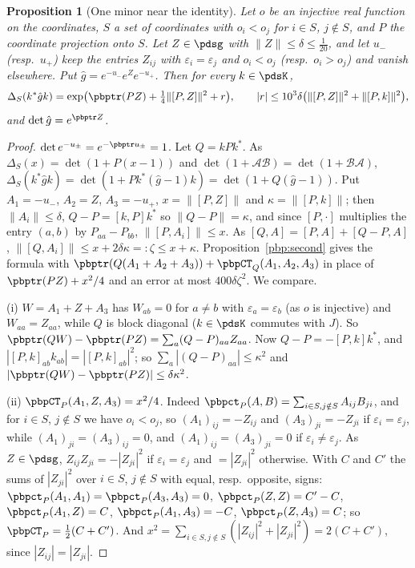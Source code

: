 \documentclass[10pt]{amsart}
\newtheorem{proposition}[theorem]{Proposition}
\theoremstyle{definition}
\theoremstyle{remark}
\begin{document}
\begin{proposition}[One minor near the identity]\label{pbp:minorconj}
Let $o$ be an injective real function on the coordinates, $S$ a set of coordinates with $o_i<o_j$
for $i\in S$, $j\notin S$, and $P$ the coordinate projection onto $S$. Let $Z\in\pdsg$ with
$\|Z\|\le\delta\le\frac1{20}$, and let $u_-$ \textup(resp.\ $u_+$\textup) keep the entries $Z_{ij}$ with
$\varepsilon_i=\varepsilon_j$ and $o_i<o_j$ \textup(resp.\ $o_i>o_j$\textup) and vanish elsewhere. Put
$\hat g=e^{-u_-}e^Ze^{-u_+}$. Then for every $k\in\pdsK$,
\[
\Delta_S(k^*\hat gk)=\exp\bigl(\pbptr(PZ)+\tfrac14\|[P,Z]\|^2+r\bigr),\qquad|r|\le10^3\delta\bigl(
\|[P,Z]\|^2+\|[P,k]\|^2\bigr),
\]
and $\det\hat g=e^{\pbptr Z}$.
\end{proposition}
\begin{proof}
$\det e^{-u_\pm}=e^{-\pbptr u_\pm}=1$. Let $Q=kPk^*$. As $\Delta_S(x)=\det(1+P(x-1))$ and $\det(1+
\mathcal A\mathcal B)=\det(1+\mathcal B\mathcal A)$, $\Delta_S(k^*\hat gk)=\det(1+Pk^*(\hat g-1)k)=\det(1+
Q(\hat g-1))$. Put $A_1=-u_-$, $A_2=Z$, $A_3=-u_+$, $x=\|[P,Z]\|$ and $\kappa=\|[P,k]\|$; then
$\|A_i\|\le\delta$, $Q-P=[k,P]k^*$ so $\|Q-P\|=\kappa$, and since $[P,\cdot]$ multiplies the entry
$(a,b)$ by $P_{aa}-P_{bb}$, $\|[P,A_i]\|\le x$. As $[Q,A]=[P,A]+[Q-P,A]$, $\|[Q,A_i]\|\le x+2\delta\kappa
=:\zeta\le x+\kappa$. Proposition~\ref{pbp:second} gives the formula with $\pbptr(Q(A_1+A_2+A_3))+
\pbpCT_Q(A_1,A_2,A_3)$ in place of $\pbptr(PZ)+x^2/4$ and an error at most $400\delta\zeta^2$. We compare.

(i) $W=A_1+Z+A_3$ has $W_{ab}=0$ for $a\ne b$ with $\varepsilon_a=\varepsilon_b$ (as $o$ is injective) and
$W_{aa}=Z_{aa}$, while $Q$ is block diagonal ($k\in\pdsK$ commutes with $J$). So $\pbptr(QW)-
\pbptr(PZ)=\sum_a(Q-P)_{aa}Z_{aa}$. Now $Q-P=-[P,k]k^*$, and $|[P,k]_{ab}k_{ab}|=|[P,k]_{ab}|^2$; so
$\sum_a|(Q-P)_{aa}|\le\kappa^2$ and $|\pbptr(QW)-\pbptr(PZ)|\le\delta\kappa^2$.

(ii) $\pbpCT_P(A_1,Z,A_3)=x^2/4$. Indeed $\pbpct_P(A,B)=\sum_{i\in S,j\notin S}A_{ij}B_{ji}$, and for
$i\in S$, $j\notin S$ we have $o_i<o_j$, so $(A_1)_{ij}=-Z_{ij}$ and $(A_3)_{ji}=-Z_{ji}$ if
$\varepsilon_i=\varepsilon_j$, while $(A_1)_{ji}=(A_3)_{ij}=0$, and $(A_1)_{ij}=(A_3)_{ji}=0$ if
$\varepsilon_i\ne\varepsilon_j$. As $Z\in\pdsg$, $Z_{ij}Z_{ji}=-|Z_{ji}|^2$ if $\varepsilon_i=
\varepsilon_j$ and $=|Z_{ji}|^2$ otherwise. With $C$ and $C'$ the sums of $|Z_{ji}|^2$ over $i\in S$,
$j\notin S$ with equal, resp.\ opposite, signs: $\pbpct_P(A_1,A_1)=\pbpct_P(A_3,A_3)=0$, $\pbpct_P(Z,Z)
=C'-C$, $\pbpct_P(A_1,Z)=C$, $\pbpct_P(A_1,A_3)=-C$, $\pbpct_P(Z,A_3)=C$; so $\pbpCT_P=\frac12(C+C')$.
And $x^2=\sum_{i\in S,j\notin S}(|Z_{ij}|^2+|Z_{ji}|^2)=2(C+C')$, since $|Z_{ij}|=|Z_{ji}|$.


\end{proof}
\end{document}
